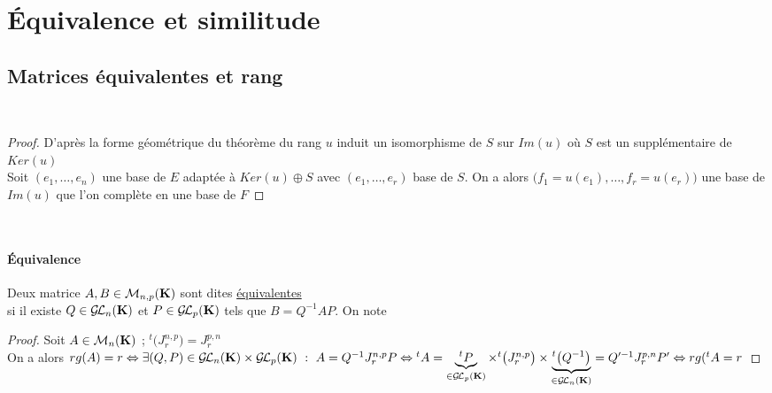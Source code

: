 	\section{Équivalence et similitude}
	\subsection{Matrices équivalentes et rang}
		${}$ \\ 
		\begin{proof}
		D'après la forme géométrique du théorème du rang %
        $u$ induit un isomorphisme de $S$ sur $Im(u)$ où $S$ est un 
		supplémentaire de $Ker(u)$\\ Soit $(e_1,\dots ,e_n)$ une base de $E$ adaptée à $Ker(u) \oplus S$ avec $(e_1,\dots ,e_r)$ base de $S$.
		On a alors $\big(f_1=u(e_1) ,\dots ,f_r=u(e_r) \big)$ une base de $Im(u)$ que l'on complète %
        en une base de $F$
		\end{proof} ${}$ \traitd
		\paragraph{Équivalence}
			Deux matrice $A,B \in{\mathcal{M}}_{n,p}({\mathbf{K}})$ sont dites \underline{équivalentes} \\si il existe $Q\in\GL_n(\K)$ et $P\in\GL_p(\K)$ tels que 
			$B=Q^{-1} AP$. On note  \trait
		\vspace*{0.5cm} \\  
		\begin{proof}
		Soit $A\in{\mathcal{M}}_n({\mathbf{K}})$ ; ${^t\big(J_r^{n,p}\big)}=J_r^{p,n}$ \vspace*{0.2cm} \\ On a alors $rg(A)=r \Leftrightarrow \exists (Q,P)\in\GL_n(\K)
		\times\GL_p(\K) ~:~A=Q^{-1}J_r^{n,p}P \vspace*{0.2cm} \\ \Leftrightarrow {^tA} = \underbrace{^tP}_{\in\GL_p(\K)} \times {^t\big(J_r^{n,p}
		\big)}\times \underbrace{^t\big( Q^{-1}\big)}_{\in\GL_n(\K)} = Q'^{-1} J_r^{p,n} P' \Leftrightarrow rg({^tA} = r$
		\end{proof} \traitd
